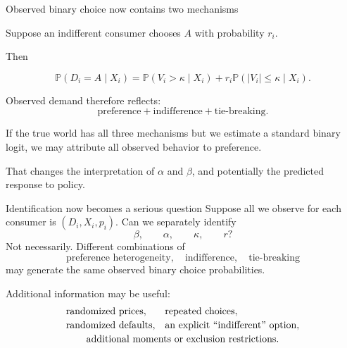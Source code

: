 \documentclass[aspectratio=169,11pt]{beamer}
\newcommand{\Pp}{\mathbb{P}}
\begin{document}
\begin{frame}{Observed binary choice now contains two mechanisms}

Suppose an indifferent consumer chooses $A$ with probability $r_i$.

Then

\[
\Pp(D_i=A\mid X_i)
=
\Pp(V_i>\kappa\mid X_i)
+
r_i
\Pp(|V_i|\leq\kappa\mid X_i).
\]

Observed demand therefore reflects:
\[
\boxed{
\text{preference}
+
\text{indifference}
+
\text{tie-breaking}.
}
\]

\vspace{0.35em}

If the true world has all three mechanisms but we estimate a standard
binary logit, we may attribute all observed behavior to preference.

\vspace{0.35em}

That changes the interpretation of $\alpha$ and $\beta$,
and potentially the predicted response to policy.

\end{frame}

\begin{frame}{Identification now becomes a serious question}
Suppose all we observe for each consumer is $(D_i,X_i,p_i)$.
Can we separately identify
\[
\beta,\qquad \alpha,\qquad \kappa,\qquad r?
\]
Not necessarily. Different combinations of
\[
\text{preference heterogeneity},
\quad
\text{indifference},
\quad
\text{tie-breaking}
\]
may generate the same observed binary choice probabilities.

Additional information may be useful:
\[
\begin{array}{ll}
\text{randomized prices},
&
\text{repeated choices},
\\[0.2em]
\text{randomized defaults},
&
\text{an explicit ``indifferent'' option},
\\[0.2em]
\multicolumn{2}{c}{\text{additional moments or exclusion restrictions}.}
\end{array}
\]
\end{frame}
\end{document}
